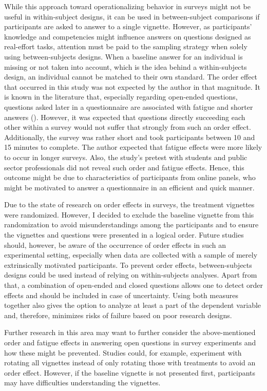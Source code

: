 \documentclass[twocolumn, serif, empirical, authordate]{jote-article}
\begin{document}
While this approach toward operationalizing behavior in surveys might not be useful in within-subject designs, it can be used in between-subject comparisons if participants are asked to answer to a single vignette. However, as participants' knowledge and competencies might influence answers on questions designed as real-effort tasks, attention must be paid to the sampling strategy when solely using between-subjects designs. When a baseline answer for an individual is missing or not taken into account, which is the idea behind a within-subjects design, an individual cannot be matched to their own standard. The order effect that occurred in this study was not expected by the author in that magnitude. It is known in the literature that, especially regarding open-ended questions, questions asked later in a questionnaire are associated with fatigue and shorter answers (). However, it was expected that questions directly succeeding each other within a survey would not suffer that strongly from such an order effect. Additionally, the survey was rather short and took participants between 10 and 15 minutes to complete. The author expected that fatigue effects were more likely to occur in longer surveys. Also, the study's pretest with students and public sector professionals did not reveal such order and fatigue effects. Hence, this outcome might be due to characteristics of participants from online panels, who might be motivated to answer a questionnaire in an efficient and quick manner.

Due to the state of research on order effects in surveys, the treatment vignettes were randomized. However, I decided to exclude the baseline vignette from this randomization to avoid misunderstandings among the participants and to ensure the vignettes and questions were presented in a logical order. Future studies should, however, be aware of the occurrence of order effects in such an experimental setting, especially when data are collected with a sample of merely extrinsically motivated participants. To prevent order effects, between-subjects designs could be used instead of relying on within-subjects analyses. Apart from that, a combination of open-ended and closed questions allows one to detect order effects and should be included in case of uncertainty. Using both measures together also gives the option to analyze at least a part of the dependent variable and, therefore, minimizes risks of failure based on poor research designs.

Further research in this area may want to further consider the above-mentioned order and fatigue effects in answering open questions in survey experiments and how these might be prevented. Studies could, for example, experiment with rotating all vignettes instead of only rotating those with treatments to avoid an order effect. However, if the baseline vignette is not presented first, participants may have difficulties understanding the vignettes.
\end{document}
